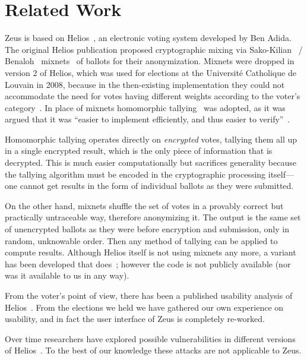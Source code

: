\documentclass[letterpaper,10pt]{article}
\begin{document}
\section{Related Work}
\label{sec:related}

Zeus is based on Helios~\cite{adida:2008}, an electronic voting system
developed by Ben Adida. The original Helios publication
\cite{adida:2008} proposed cryptographic mixing via
Sako-Kilian~\cite{sako:1995} / Benaloh~\cite{benaloh:2006}
mixnets~\cite{sako:1995} of ballots for their anonymization. Mixnets
were dropped in version 2 of Helios, which was used for elections at
the Universit\'{e} Catholique de Louvain in 2008, because in the
then-existing implementation they could not accommodate the need for
votes having different weights according to the voter's
category~\cite{adida:2009}. In place of mixnets homomorphic
tallying~\cite{cohen:1985} was adopted, as it was argued that it was
``easier to implement efficiently, and thus easier to
verify''~\cite{adida:2009}.

Homomorphic tallying operates directly on \emph{encrypted} votes,
tallying them all up in a single encrypted result, which is the only
piece of information that is decrypted. This is much easier
computationally but sacrifices generality because the tallying
algorithm must be encoded in the cryptographic processing itself---one
cannot get results in the form of individual ballots as they were
submitted.

On the other hand, mixnets shuffle the set of votes in a provably
correct but practically untraceable way, therefore anonymizing it. The
output is the same set of unencrypted ballots as they were before
encryption and submission, only in random, unknowable order. Then any
method of tallying can be applied to compute results. Although Helios
itself is not using mixnets any more, a variant has been developed
that does~\cite{bulens:2011}; however the code is not publicly
available (nor was it available to us in any way).

From the voter's point of view, there has been a published usability
analysis of Helios~\cite{karayumak:2011}. From the
elections we held we have gathered our own experience on usability,
and in fact the user interface of Zeus is completely re-worked.

Over time researchers have explored possible vulnerabilities in
different versions of Helios~\cite{estehghari:2010,heiderich:2011}. To
the best of our knowledge these attacks are not applicable to Zeus.
\end{document}
